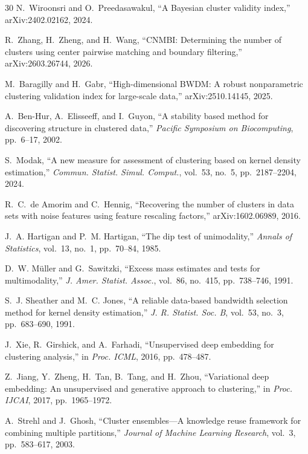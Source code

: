 \documentclass[journal]{IEEEtran}
\begin{document}
\begin{thebibliography}{30}
N.~Wiroonsri and O.~Preedasawakul, ``A Bayesian cluster validity index,'' arXiv:2402.02162, 2024.

R.~Zhang, H.~Zheng, and H.~Wang, ``CNMBI: Determining the number of clusters using center pairwise matching and boundary filtering,'' arXiv:2603.26744, 2026.

M.~Baragilly and H.~Gabr, ``High-dimensional BWDM: A robust nonparametric clustering validation index for large-scale data,'' arXiv:2510.14145, 2025.

A.~Ben-Hur, A.~Elisseeff, and I.~Guyon, ``A stability based method for discovering structure in clustered data,'' \textit{Pacific Symposium on Biocomputing}, pp.~6--17, 2002.

S.~Modak, ``A new measure for assessment of clustering based on kernel density estimation,'' \textit{Commun. Statist. Simul. Comput.}, vol.~53, no.~5, pp.~2187--2204, 2024.

R.~C.~de Amorim and C.~Hennig, ``Recovering the number of clusters in data sets with noise features using feature rescaling factors,'' arXiv:1602.06989, 2016.

J.~A. Hartigan and P.~M. Hartigan, ``The dip test of unimodality,'' \textit{Annals of Statistics}, vol.~13, no.~1, pp.~70--84, 1985.

D.~W. M\"uller and G.~Sawitzki, ``Excess mass estimates and tests for multimodality,'' \textit{J. Amer. Statist. Assoc.}, vol.~86, no.~415, pp.~738--746, 1991.

S.~J. Sheather and M.~C. Jones, ``A reliable data-based bandwidth selection method for kernel density estimation,'' \textit{J. R. Statist. Soc. B}, vol.~53, no.~3, pp.~683--690, 1991.

J.~Xie, R.~Girshick, and A.~Farhadi, ``Unsupervised deep embedding for clustering analysis,'' in \textit{Proc. ICML}, 2016, pp.~478--487.

Z.~Jiang, Y.~Zheng, H.~Tan, B.~Tang, and H.~Zhou, ``Variational deep embedding: An unsupervised and generative approach to clustering,'' in \textit{Proc. IJCAI}, 2017, pp.~1965--1972.

A.~Strehl and J.~Ghosh, ``Cluster ensembles---A knowledge reuse framework for combining multiple partitions,'' \textit{Journal of Machine Learning Research}, vol.~3, pp.~583--617, 2003.


\end{thebibliography}
\end{document}
